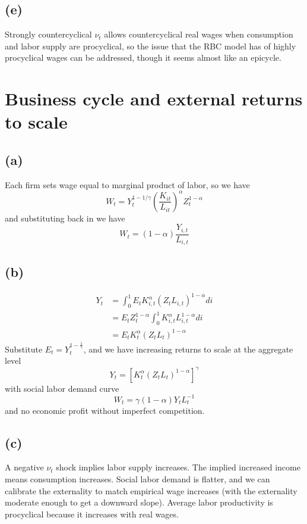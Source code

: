 \documentclass[12pt]{article}
\begin{document}
        \subsection*{(e)} Strongly countercyclical $\nu_t$ allows countercyclical real wages when consumption and labor supply are procyclical, so the issue that the RBC model has of highly procyclical wages can be addressed, though it seems almost like an epicycle.
    
    
    \section{Business cycle and external returns to scale}
    
    \subsection*{(a)}
    
    Each firm sets wage equal to marginal product of labor, so we have
    \[
    W_t = Y_t^{1-1/\gamma} \left(\frac{K_{it}}{L_{it}}\right)^{\alpha} Z_t^{1-\alpha}
    \]
    and substituting back in we have
    \[
    W _ { t } = ( 1- \alpha ) \frac{Y_{i,t}}{L_{i,t}}
    \]
    \subsection*{(b)}
    
    \begin{align*}
        Y_t &= \int_{0}^{1} E_t K_{i,t}^\alpha \left( Z_t L_{i,t} \right)^{1-\alpha} di \\
        & = E_t Z_t^{1-\alpha} \int_{0}^{1} K_{i,t}^\alpha  L_{i,t}^{1-\alpha} di \\
        & = E_t K_t^\alpha (Z_t L_t)^{1-\alpha}
        \end{align*}
        Substitute $E_t = Y_t^{1- \frac{1}{\gamma}}$, and we have increasing returns to scale at the aggregate level
        \begin{equation*}
        Y _ { t } = \left[ K _ { t } ^ { \alpha } \left( Z _ { t } L _ { t } \right) ^ { 1- \alpha } \right] ^ { \gamma }
        \end{equation*}
        with social labor demand curve
        \[
        W _ { t } = \gamma ( 1- \alpha ) Y _ { t } L _ { t } ^ { - 1}
        \] and no economic profit without imperfect competition. 
    
    \subsection*{(c)}
    A negative $\nu_t$ shock implies labor supply increases. 
    The implied increased income means consumption increases. 
    Social labor demand is flatter, and we can calibrate the externality to match empirical wage increases (with the externality moderate enough to get a downward slope).
    Average labor productivity is procyclical because it increases with real wages. 
    
\end{document}
